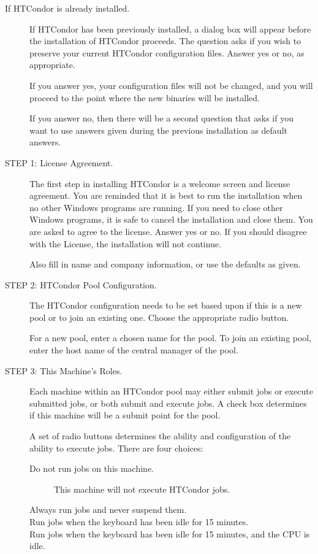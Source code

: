 \begin{description}
\item[If HTCondor is already installed.]

     If HTCondor has been previously installed,
     a dialog box will appear before the installation of HTCondor proceeds.
     The question asks if you wish to preserve your current
     HTCondor configuration files.
     Answer yes or no, as appropriate.
	 
     If you answer yes, your configuration files will not be changed, 
     and you will proceed to the point where the new binaries will be installed.

     If you answer no, then there will be a second question
     that asks if you want to use answers
     given during the previous installation
     as default answers.

\item[STEP 1: License Agreement.]

     The first step in installing HTCondor
     is a welcome screen and license agreement.
     You are reminded that it is best to run the installation
     when no other Windows programs are running.
     If you need to close other Windows programs, it is safe to cancel the
     installation and close them.
     You are asked to agree to the license.
     Answer yes or no.  If you should disagree with the License, the
     installation will not continue.

     Also fill in name and company information,
     or use the defaults as given.

\item[STEP 2: HTCondor Pool Configuration.]

     The HTCondor configuration needs to be set based upon
     if this is a new pool or to join an existing one.
     Choose the appropriate radio button.

     For a new pool, enter a chosen name for the pool.
     To join an existing pool, 
     enter the host name of the central manager of the pool.

\item[STEP 3: This Machine's Roles.] 

     Each machine within an HTCondor pool may either
     submit jobs or execute submitted jobs, or both
     submit and execute jobs.
     A check box determines if this machine will be a submit point for
     the pool.

     A set of radio buttons determines the ability and configuration of
     the ability to execute jobs.
     There are four choices:
     \begin{description}
     \item[Do not run jobs on this machine.]
     This machine will not execute HTCondor jobs.
     \item[Always run jobs and never suspend them.]
     \item[Run jobs when the keyboard has been idle for 15 minutes.]
     \item[Run jobs when the keyboard has been idle for 15 minutes,
and the CPU is idle.]
     \end{description}


\end{description}
